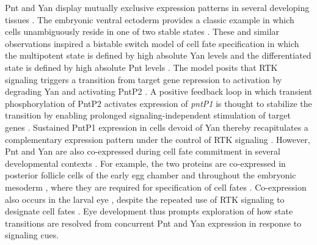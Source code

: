 Pnt and Yan display mutually exclusive expression patterns in several developing tissues \cite{BoisclairLachance2014}. The embryonic ventral ectoderm provides a classic example in which cells unambiguously reside in one of two stable states \cite{Gabay1996,Melen2005}. These and similar observations inspired a bistable switch model of cell fate specification in which the multipotent state is defined by high absolute Yan levels and the differentiated state is defined by high absolute Pnt levels \cite{Graham2010}. The model posits that RTK signaling triggers a transition from target gene repression to activation by degrading Yan and activating PntP2 \cite{Brunner1994,Rebay1995}. A positive feedback loop in which transient phosphorylation of PntP2 activates expression of \textit{pntP1} is thought to stabilize the transition by enabling prolonged signaling-independent stimulation of target genes \cite{Shwartz2013}. Sustained PntP1 expression in cells devoid of Yan thereby recapitulates a complementary expression pattern under the control of RTK signaling \cite{BoisclairLachance2014}. However, Pnt and Yan are also co-expressed during cell fate commitment in several developmental contexts \cite{BoisclairLachance2014}. For example, the two proteins are co-expressed in posterior follicle cells of the early egg chamber and throughout the embryonic mesoderm \cite{BoisclairLachance2014}, where they are required for specification of cell fates \cite{Morimoto1996,Halfon2000}. Co-expression also occurs in the larval eye \cite{BoisclairLachance2014}, despite the repeated use of RTK signaling to designate cell fates \cite{Freeman1996}. Eye development thus prompts exploration of how state transitions are resolved from concurrent Pnt and Yan expression in response to signaling cues.

